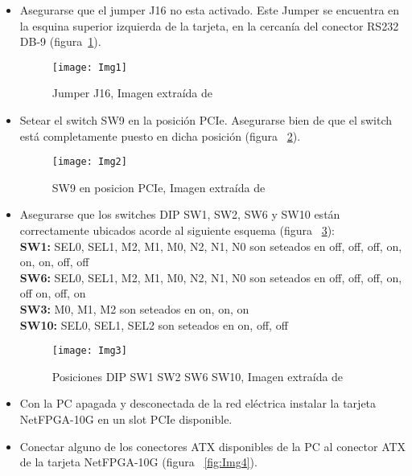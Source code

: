 \begin{itemize}
\item Asegurarse que el jumper J16 no esta activado. Este Jumper se encuentra en la esquina superior izquierda de la tarjeta, en la cercanía del conector RS232 DB-9 (figura~\ref{fig:Img1}).

\begin{figure}[htbp!] 
\centering    
\texttt{[image: Img1]}
\caption[Jumper J16]{Jumper J16, Imagen extra\'ida de \citep{NetFPGA6}}
\label{fig:Img1}
\end{figure}

\item Setear el switch SW9 en la posición PCIe. Asegurarse bien de que el switch est\'a completamente puesto en dicha posición (figura ~\ref{fig:Img2}).

\begin{figure}[htbp!] 
\centering    
\texttt{[image: Img2]}
\caption[SW9 en posicion PCIe]{SW9 en posicion PCIe, Imagen extra\'ida de \citep{NetFPGA6}}
\label{fig:Img2}
\end{figure}

\item Asegurarse que los switches DIP SW1, SW2, SW6 y SW10 están correctamente ubicados acorde al siguiente esquema (figura ~\ref{fig:Img3}):\\

\textbf{SW1:} SEL0, SEL1, M2, M1, M0, N2, N1, N0 son seteados en off, off, off, on, on, on, off, off\\
\textbf{SW6:} SEL0, SEL1, M2, M1, M0, N2, N1, N0 son seteados en off, off, off, on, off on, off, on\\
\textbf{SW3:} M0, M1, M2 son seteados en on, on, on\\
\textbf{SW10:} SEL0, SEL1, SEL2 son seteados en on, off, off\\

\begin{figure}[htbp!] 
\centering    
\texttt{[image: Img3]}
\caption[Posiciones DIP SW1 SW2 SW6 SW10]{Posiciones DIP SW1 SW2 SW6 SW10, Imagen extra\'ida de \citep{NetFPGA6}}
\label{fig:Img3}
\end{figure}

\item Con la PC apagada y desconectada de la red el\'ectrica instalar la tarjeta NetFPGA-10G en un slot PCIe disponible.

\item Conectar alguno de los conectores ATX disponibles de la PC al conector ATX de la tarjeta NetFPGA-10G (figura ~\ref{fig:Img4}).


\end{itemize}
